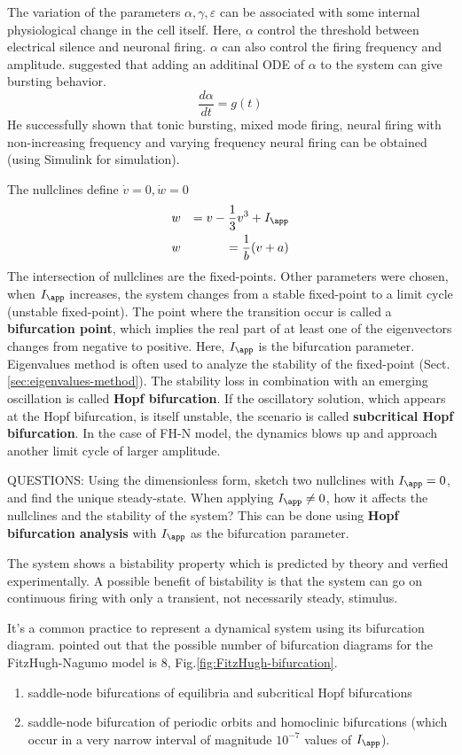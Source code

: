 The variation of the parameters $\alpha, \gamma, \varepsilon$ can be associated
with some internal physiological change in the cell itself.  Here, $\alpha$
control the threshold between electrical silence and neuronal firing. $\alpha$
can also control the firing frequency and amplitude. \citep{faghih2010}
suggested that adding an additinal ODE of $\alpha$ to the system can give
bursting behavior.
\begin{equation}
\frac{d\alpha}{dt}=g(t)
\end{equation}
He successfully shown that tonic bursting, mixed mode firing, neural firing with
non-increasing frequency and varying frequency neural firing can be obtained
(using Simulink for simulation).  

The nullclines define $\dot{v}=0, \dot{w}=0$
\begin{eqnarray}
w &&= v - \frac{1}{3}v^3 + I_\app	\\
w &&= \frac{1}{b}(v+a) 
\end{eqnarray}
The intersection of nullclines are the fixed-points. Other parameters were 
chosen, when $I_\app$ increases, the system changes from a stable fixed-point to
a limit cycle (unstable fixed-point). The point where the transition occur is
called a {\bf bifurcation point}, which implies the real part of at least one
of the eigenvectors changes from negative to positive.
Here, $I_\app$ is the bifurcation parameter.
Eigenvalues method is often used to analyze the stability of the fixed-point
(Sect.\ref{sec:eigenvalues-method}). The stability loss in combination with an
emerging oscillation is called {\bf Hopf bifurcation}. If the oscillatory
solution, which appears at the Hopf bifurcation, is itself unstable, the
scenario is called {\bf subcritical Hopf bifurcation}. In the case of FH-N
model, the dynamics blows up and approach another limit cycle of larger
amplitude.


QUESTIONS: Using the dimensionless form, sketch two nullclines with $I_\app=0$,
and find the unique steady-state. When applying $I_\app\ne 0$, how it affects
the nullclines and the stability of the system? This can be done using {\bf
Hopf bifurcation analysis} with $I_\app$ as the bifurcation parameter. 

The system shows a bistability property which is predicted by theory and verfied
experimentally. A possible benefit of bistability is that the system can go on
continuous firing with only a transient, not necessarily steady, stimulus. 

It's a common practice to represent a dynamical system using its bifurcation
diagram. \citep{kostova2004} pointed out that the possible number of 
bifurcation diagrams for the FitzHugh-Nagumo model is 8,
Fig.\ref{fig:FitzHugh-bifurcation}.
\begin{enumerate}
  \item saddle-node bifurcations of equilibria and subcritical Hopf bifurcations
  \item saddle-node bifurcation of periodic orbits and homoclinic bifurcations
  (which occur in a very narrow interval of magnitude $10^{-7}$ values of
  $I_\app$).
\end{enumerate}

